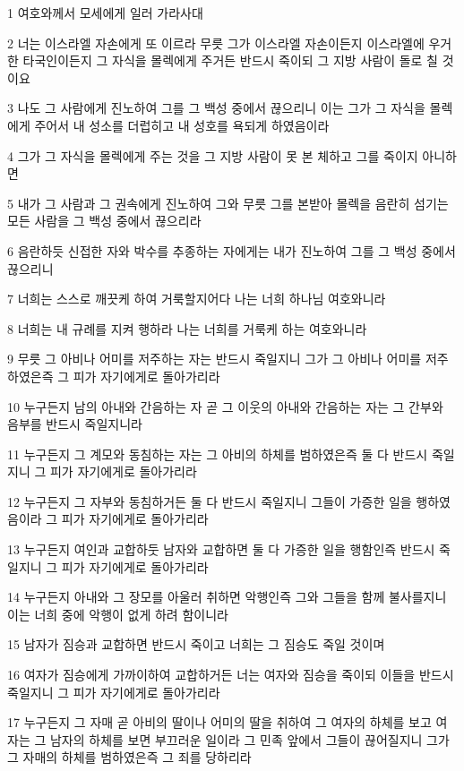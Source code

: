 \par 1 여호와께서 모세에게 일러 가라사대
\par 2 너는 이스라엘 자손에게 또 이르라 무릇 그가 이스라엘 자손이든지 이스라엘에 우거한 타국인이든지 그 자식을 몰렉에게 주거든 반드시 죽이되 그 지방 사람이 돌로 칠 것이요
\par 3 나도 그 사람에게 진노하여 그를 그 백성 중에서 끊으리니 이는 그가 그 자식을 몰렉에게 주어서 내 성소를 더럽히고 내 성호를 욕되게 하였음이라
\par 4 그가 그 자식을 몰렉에게 주는 것을 그 지방 사람이 못 본 체하고 그를 죽이지 아니하면
\par 5 내가 그 사람과 그 권속에게 진노하여 그와 무릇 그를 본받아 몰렉을 음란히 섬기는 모든 사람을 그 백성 중에서 끊으리라
\par 6 음란하듯 신접한 자와 박수를 추종하는 자에게는 내가 진노하여 그를 그 백성 중에서 끊으리니
\par 7 너희는 스스로 깨끗케 하여 거룩할지어다 나는 너희 하나님 여호와니라
\par 8 너희는 내 규례를 지켜 행하라 나는 너희를 거룩케 하는 여호와니라
\par 9 무릇 그 아비나 어미를 저주하는 자는 반드시 죽일지니 그가 그 아비나 어미를 저주하였은즉 그 피가 자기에게로 돌아가리라
\par 10 누구든지 남의 아내와 간음하는 자 곧 그 이웃의 아내와 간음하는 자는 그 간부와 음부를 반드시 죽일지니라
\par 11 누구든지 그 계모와 동침하는 자는 그 아비의 하체를 범하였은즉 둘 다 반드시 죽일지니 그 피가 자기에게로 돌아가리라
\par 12 누구든지 그 자부와 동침하거든 둘 다 반드시 죽일지니 그들이 가증한 일을 행하였음이라 그 피가 자기에게로 돌아가리라
\par 13 누구든지 여인과 교합하둣 남자와 교합하면 둘 다 가증한 일을 행함인즉 반드시 죽일지니 그 피가 자기에게로 돌아가리라
\par 14 누구든지 아내와 그 장모를 아울러 취하면 악행인즉 그와 그들을 함께 불사를지니 이는 너희 중에 악행이 없게 하려 함이니라
\par 15 남자가 짐승과 교합하면 반드시 죽이고 너희는 그 짐승도 죽일 것이며
\par 16 여자가 짐승에게 가까이하여 교합하거든 너는 여자와 짐승을 죽이되 이들을 반드시 죽일지니 그 피가 자기에게로 돌아가리라
\par 17 누구든지 그 자매 곧 아비의 딸이나 어미의 딸을 취하여 그 여자의 하체를 보고 여자는 그 남자의 하체를 보면 부끄러운 일이라 그 민족 앞에서 그들이 끊어질지니 그가 그 자매의 하체를 범하였은즉 그 죄를 당하리라
